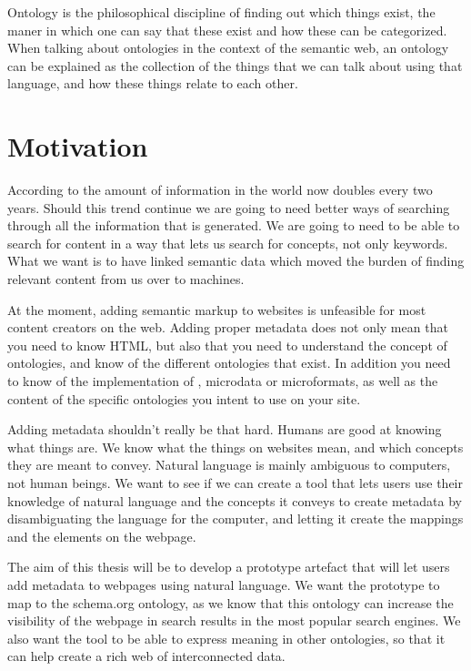 Ontology is the philosophical discipline of finding out which things exist,
the maner in which one can say that these exist and how these can be categorized.
When talking about ontologies in the context of the semantic web,
an ontology can be explained as the collection of the things that we can talk about using that language,
and how these things relate to each other.


\section{Motivation}
According to \citet{Gantz2011} the amount of information in the world now doubles every two years.
Should this trend continue we are going to need better ways of searching through all the information that is generated.
We are going to need to be able to search for content in a way that lets us search for concepts, not only keywords.
What we want is to have linked semantic data which moved the burden of finding relevant content from us over to machines.

At the moment, adding semantic markup to websites is unfeasible for most content creators on the web.
Adding proper metadata does not only mean that you need to know HTML,
but also that you need to understand the concept of ontologies, and know of the different ontologies that exist.
In addition you need to know of the implementation of , microdata or microformats,
as well as the content of the specific ontologies you intent to use on your site.

Adding metadata shouldn't really be that hard.
Humans are good at knowing what things are.
We know what the things on websites mean, and which concepts they are meant to convey.
Natural language is mainly ambiguous to computers, not human beings.
We want to see if we can create a tool that lets users use their knowledge of natural language and the concepts it conveys
to create metadata by disambiguating the language for the computer, and letting it create the mappings and the elements on the webpage.

The aim of this thesis will be to develop a prototype artefact that will let users add metadata to webpages using natural language.
We want the prototype to map to the schema.org ontology,
as we know that this ontology can increase the visibility of the webpage in search results in the most popular search engines.
We also want the tool to be able to express meaning in other ontologies, so that it can help create a rich web of interconnected data.

